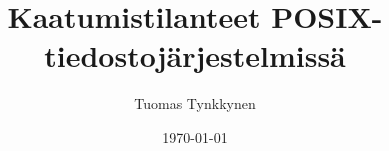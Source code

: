 \documentclass[finnish]{tktltiki2/tktltiki2}
\title{Kaatumistilanteet POSIX-tiedostojärjestelmissä}
\author{Tuomas Tynkkynen}
\date{\today}
\theoremstyle{definition}
\theoremstyle{remark}
\begin{document}


\frontmatter      %
\maketitle        %
\makeabstract     %

\tableofcontents  %


\mainmatter


%
%
% 
%

% 
% 



\end{document}
